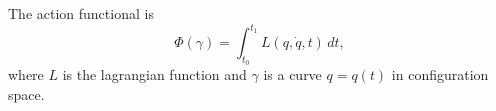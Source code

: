 The action functional is
$$\Phi(\gamma) = \int_{t_0}^{t_1} L(q, \dot{q}, t) \, dt,$$
where $L$ is the lagrangian function and $\gamma$ is a curve $q = q(t)$ in configuration space.
